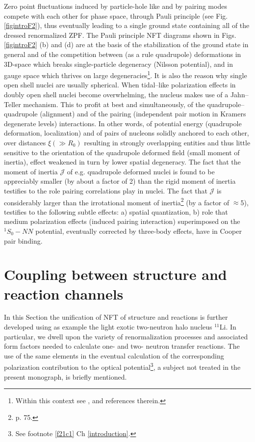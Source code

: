 Zero point fluctuations induced by particle-hole like and by pairing modes compete with each other for phase space, through Pauli principle (see Fig. \ref{figintroF2}), thus eventually leading to a single ground state containing all of the dressed renormalized ZPF. The Pauli principle NFT diagrams shown in Figs. \ref{figintroF2} (b) and (d) are at the basis of the stabilization of the ground state in general and of the competition between (as a rule quadrupole) deformations in 3D-space which breaks single-particle degeneracy (Nilsson potential), and in gauge space which thrives on large degeneracies\footnote{Within this context see \cite{Bayman:61,Bes:69,Mottelson:62,Bohr:75}, and references therein.}. It is also the reason why single open shell nuclei are usually spherical. When tidal--like polarization effects in doubly open shell nuclei become overwhelming, the nucleus makes use of a Jahn--Teller mechanism. This to profit at best and simultaneously, of the quadrupole--quadrupole (alignment) and of the pairing (independent pair motion in Kramers degenerate levels) interactions. In other words, of potential energy (quadrupole deformation, localization) and of pairs of nucleons solidly anchored to each other, over distances $\xi (\gg R_0)$ resulting in strongly overlapping entities and thus little sensitive to the orientation of the quadrupole deformed field (small moment of inertia), effect weakened in turn by  lower spatial degeneracy. The fact that the moment of inertia $\mathcal J$ of e.g. quadrupole deformed nuclei is found to be appreciably smaller (by about a factor of 2) than the rigid moment of inertia testifies to the role pairing correlations play in nuclei. The fact that $\mathcal J$ is considerably larger than the irrotational moment of inertia\footnote{\cite{Bohr:75} p. 75.} (by a factor of $\approx$5), testifies to the following subtle effects: a)  spatial quantization, b) role that medium polarization effects (induced pairing interaction) superimposed on the $^1S_0-NN$ potential, eventually corrected by  three-body effects, have in Cooper pair binding.
\clearpage

\section[Coupling between structure and reactions]{Coupling between structure and reaction channels}\label{C1S9}
In this Section the unification of NFT of structure and reactions is further developed using as example the light exotic two-neutron halo nucleus $^{11}$Li. In particular, we dwell upon the variety of renormalization processes and associated form factors needed to calculate one- and two- neutron transfer reactions. The use of the same elements in the eventual calculation of the corresponding polarization contribution to the optical potential\footnote{\label{footnoteOM}See footnote \ref{f21c1} Ch \ref{introduction}.}, a subject not treated in the present monograph, is briefly mentioned.  
